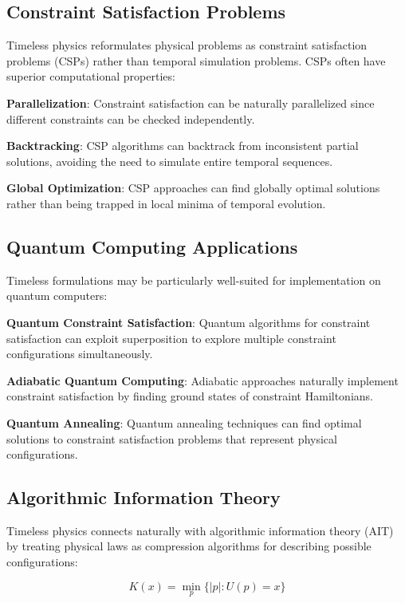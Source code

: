 \documentclass[12pt]{article}
\begin{document}
\subsection{Constraint Satisfaction Problems}

Timeless physics reformulates physical problems as constraint satisfaction problems (CSPs) rather than temporal simulation problems. CSPs often have superior computational properties:

\textbf{Parallelization}: Constraint satisfaction can be naturally parallelized since different constraints can be checked independently.

\textbf{Backtracking}: CSP algorithms can backtrack from inconsistent partial solutions, avoiding the need to simulate entire temporal sequences.

\textbf{Global Optimization}: CSP approaches can find globally optimal solutions rather than being trapped in local minima of temporal evolution.

\subsection{Quantum Computing Applications}

Timeless formulations may be particularly well-suited for implementation on quantum computers:

\textbf{Quantum Constraint Satisfaction}: Quantum algorithms for constraint satisfaction can exploit superposition to explore multiple constraint configurations simultaneously.

\textbf{Adiabatic Quantum Computing}: Adiabatic approaches naturally implement constraint satisfaction by finding ground states of constraint Hamiltonians.

\textbf{Quantum Annealing}: Quantum annealing techniques can find optimal solutions to constraint satisfaction problems that represent physical configurations.

\subsection{Algorithmic Information Theory}

Timeless physics connects naturally with algorithmic information theory (AIT) by treating physical laws as compression algorithms for describing possible configurations:

\begin{equation}
K(x) = \min_{p}\{|p| : U(p) = x\}
\end{equation}
\end{document}
